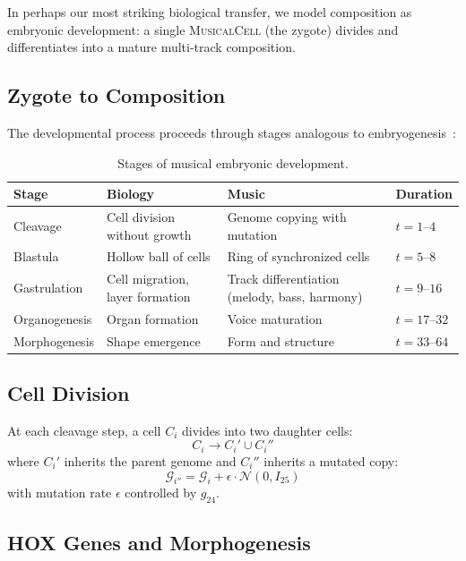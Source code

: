\documentclass[11pt,a4paper]{article}
\newcommand{\MusicalCell}{\textsc{MusicalCell}}
\newcommand{\calG}{\mathcal{G}}
\begin{document}
In perhaps our most striking biological transfer, we model composition as embryonic development: a single \MusicalCell{} (the zygote) divides and differentiates into a mature multi-track composition.

\subsection{Zygote to Composition}

The developmental process proceeds through stages analogous to embryogenesis~\citep{gilbert2000}:

\begin{table}[h]
\centering
\begin{tabular}{@{}llll@{}}
\toprule
\textbf{Stage} & \textbf{Biology} & \textbf{Music} & \textbf{Duration} \\
\midrule
Cleavage & Cell division without growth & Genome copying with mutation & $t = 1\text{--}4$ \\
Blastula & Hollow ball of cells & Ring of synchronized cells & $t = 5\text{--}8$ \\
Gastrulation & Cell migration, layer formation & Track differentiation (melody, bass, harmony) & $t = 9\text{--}16$ \\
Organogenesis & Organ formation & Voice maturation & $t = 17\text{--}32$ \\
Morphogenesis & Shape emergence & Form and structure & $t = 33\text{--}64$ \\
\bottomrule
\end{tabular}
\caption{Stages of musical embryonic development.}
\label{tab:development}
\end{table}

\subsection{Cell Division}

At each cleavage step, a cell $C_i$ divides into two daughter cells:
\begin{equation}
  C_i \to C_i' \cup C_i''
\end{equation}
where $C_i'$ inherits the parent genome and $C_i''$ inherits a mutated copy:
\begin{equation}
  \calG_{i''} = \calG_i + \epsilon \cdot \mathcal{N}(0, I_{25})
\end{equation}
with mutation rate $\epsilon$ controlled by $g_{24}$.

\subsection{HOX Genes and Morphogenesis}
\end{document}
